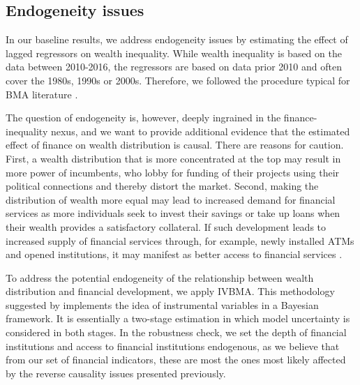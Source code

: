 \begin{refsection}
\subsection{Endogeneity issues}
In our baseline results, we address endogeneity issues by estimating the effect of lagged regressors on wealth inequality. While wealth inequality is based on the data between 2010-2016, the regressors are based on data prior 2010 and often cover the 1980s, 1990s or 2000s. Therefore, we followed the procedure typical for \ac{BMA} literature \parencite{christofides,feldkircherjimf,hasan2016}.  

The question of endogeneity is, however, deeply ingrained in the finance-inequality nexus, and we want to provide additional evidence that the estimated effect of finance on wealth distribution is causal. There are reasons for caution. First, a wealth distribution that is more concentrated at the top may result in more power of incumbents, who lobby for funding of their projects using their political connections and thereby distort the market. Second, making the distribution of wealth more equal may lead to increased demand for financial services as more individuals seek to invest their savings or take up loans when their wealth provides a satisfactory collateral. If such development leads to increased supply of financial services through, for example, newly installed ATMs and opened institutions, it may manifest as better access to financial services \parencite{beck2007finance}.

To address the potential endogeneity of the relationship between wealth distribution and financial development, we apply \ac{IVBMA}. This methodology suggested by \textcite{KarlLenkoski2012} implements the idea of instrumental variables in a Bayesian framework. It is essentially a two-stage estimation in which model uncertainty is considered in both stages. In the robustness check, we set the depth of financial institutions and access to financial institutions endogenous, as we believe that from our set of financial indicators, these are most the ones most likely affected by the reverse causality issues presented previously.


\end{refsection}
